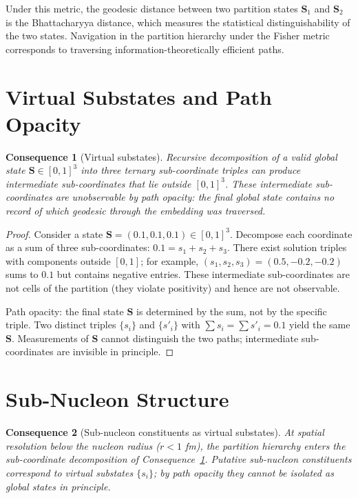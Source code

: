 \documentclass[11pt,twocolumn,a4paper]{article}
\theoremstyle{axiomstyle}
\theoremstyle{conseqstyle}
\newtheorem{consequence}{Consequence}
\theoremstyle{definition}
\theoremstyle{remark}
\begin{document}
Under this metric, the geodesic distance between two partition states $\mathbf{S}_{1}$ and $\mathbf{S}_{2}$ is the Bhattacharyya distance, which measures the statistical distinguishability of the two states. Navigation in the partition hierarchy under the Fisher metric corresponds to traversing information-theoretically efficient paths.

\section{Virtual Substates and Path Opacity}
\label{sec:virtualsubstates}

\begin{consequence}[Virtual substates]
\label{cons:virtualsubstates}
Recursive decomposition of a valid global state $\mathbf{S}\in[0,1]^{3}$ into three ternary sub-coordinate triples can produce intermediate sub-coordinates that lie outside $[0,1]^{3}$. These intermediate sub-coordinates are unobservable by path opacity: the final global state contains no record of which geodesic through the embedding was traversed.
\end{consequence}

\begin{proof}
Consider a state $\mathbf{S}=(0.1,0.1,0.1)\in[0,1]^{3}$. Decompose each coordinate as a sum of three sub-coordinates: $0.1=s_{1}+s_{2}+s_{3}$. There exist solution triples with components outside $[0,1]$; for example, $(s_{1},s_{2},s_{3})=(0.5,-0.2,-0.2)$ sums to $0.1$ but contains negative entries. These intermediate sub-coordinates are not cells of the partition (they violate positivity) and hence are not observable.

Path opacity: the final state $\mathbf{S}$ is determined by the sum, not by the specific triple. Two distinct triples $\{s_{i}\}$ and $\{s'_{i}\}$ with $\sum s_{i}=\sum s'_{i}=0.1$ yield the same $\mathbf{S}$. Measurements of $\mathbf{S}$ cannot distinguish the two paths; intermediate sub-coordinates are invisible in principle.
\end{proof}

\section{Sub-Nucleon Structure}
\label{sec:subnucleonstructure}

\begin{consequence}[Sub-nucleon constituents as virtual substates]
\label{cons:subnucleon}
At spatial resolution below the nucleon radius ($r<1$ fm), the partition hierarchy enters the sub-coordinate decomposition of Consequence~\ref{cons:virtualsubstates}. Putative sub-nucleon constituents correspond to virtual substates $\{s_{i}\}$; by path opacity they cannot be isolated as global states in principle.
\end{consequence}
\end{document}
